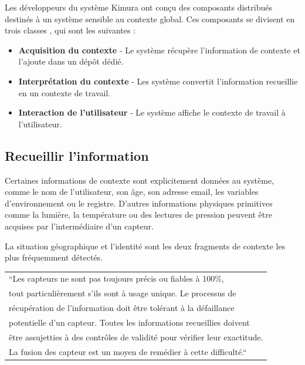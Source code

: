 Les développeurs du système Kimura ont conçu des composants distribués destinés
à un système sensible au contexte global. Ces composants se divisent en trois
classes \cite{voida_integrating_2002}, qui sont les suivantes :

\begin{itemize}
    \item \textbf{Acquisition du contexte} - Le système récupère l'information de
        contexte et l'ajoute dans un dépôt dédié.
    \item \textbf{Interprétation du contexte} - Les système convertit
        l'information recueillie en un contexte de travail.
    \item \textbf{Interaction de l'utilisateur} - Le système affiche le contexte
        de travail à l'utilisateur.
\end{itemize}

\subsection{Recueillir l'information}

Certaines informations de contexte sont explicitement données au système, comme
le nom de l'utilisateur, son âge, son adresse email, les variables
d'environnement ou le registre. D'autres informations physiques primitives comme
la lumière, la température ou des lectures de pression peuvent être acquises par
l'intermédiaire d'un capteur.

La situation géographique et l'identité sont les deux fragments de contexte les
plus fréquemment détectés.

{%
  \centering
  \begin{tabular}{l}
    ``Les capteurs ne sont pas toujours précis ou fiables à 100\%, \\
    tout particulièrement s'ils sont à usage unique. Le processus de \\
    récupération de l'information doit être tolérant à la défaillance \\
    potentielle d'un capteur. Toutes les informations recueillies doivent \\
    être assujetties à des contrôles de validité pour vérifier leur exactitude.\\
    La fusion des capteur est un moyen de remédier à cette difficulté.``
    \cite{schmidt_there_1999} \\
  \end{tabular}
\par}%

